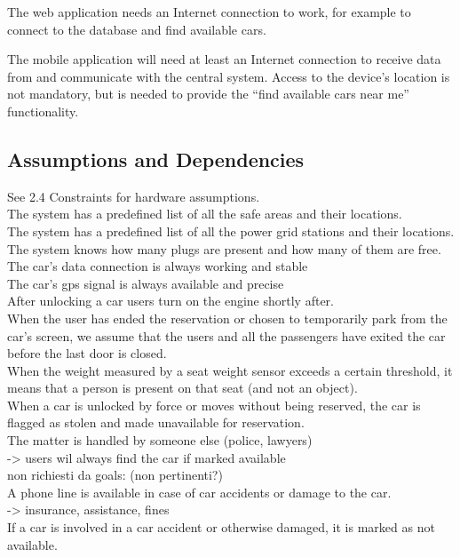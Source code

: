 \documentclass[english]{article}
\begin{document}
The web application needs an Internet connection to work, for example to connect to the database and find available cars.

The mobile application will need at least an Internet connection to receive data from and communicate with the central system. Access to the device’s location is not mandatory, but is needed to provide the “find available cars near me” functionality.

\subsection{Assumptions and Dependencies}

See 2.4 Constraints for hardware assumptions.\\


The system has a predefined list of all the safe areas and their locations.\\
The system has a predefined list of all the power grid stations and their locations.\\
The system knows how many plugs are present and how many of them are free.\\


The car’s data connection is always working and stable\\
The car’s gps signal is always available and precise\\


After unlocking a car users turn on the engine shortly after.\\


When the user has ended the reservation or chosen to temporarily park from the car’s screen, we assume that the users and all the passengers have exited the car before the last door is closed.\\


When the weight measured by a seat weight sensor exceeds a certain threshold, it means that a person is present on that seat (and not an object).\\


When a car is unlocked by force or moves without being reserved, the car is flagged as stolen and made unavailable for reservation. \\
The matter is handled by someone else (police, lawyers)\\
-> users wil always find the car if marked available\\


non richiesti da goals: (non pertinenti?)\\
A phone line is available in case of car accidents or damage to the car.\\
-> insurance, assistance, fines\\
If a car is involved in a car accident or otherwise damaged, it is marked as not available.\\
\end{document}
